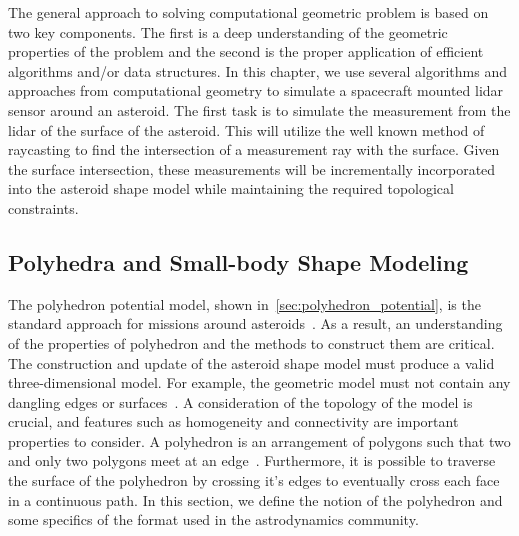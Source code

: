 The general approach to solving computational geometric problem is based on two key components.
The first is a deep understanding of the geometric properties of the problem and the second is the proper application of efficient algorithms and/or data structures.
In this chapter, we use several algorithms and approaches from computational geometry to simulate a spacecraft mounted \gls{lidar} sensor around an asteroid.
The first task is to simulate the measurement from the \gls{lidar} of the surface of the asteroid.
This will utilize the well known method of \gls{raycasting} to find the intersection of a measurement ray with the surface.
Given the surface intersection, these measurements will be incrementally incorporated into the asteroid shape model while maintaining the required topological constraints.

\subsection{Polyhedra and Small-body Shape Modeling}\label{sec:shape_model}

The polyhedron potential model, shown in~\cref{sec:polyhedron_potential}, is the standard approach for missions around asteroids~\cite{werner1994,werner1996}.
As a result, an understanding of the properties of polyhedron and the methods to construct them are critical.
The construction and update of the asteroid shape model must produce a valid three-dimensional model.
For example, the geometric model must not contain any dangling edges or surfaces~\cite{mortenson1997}.
A consideration of the topology of the model is crucial, and features such as homogeneity and connectivity are important properties to consider.
A polyhedron is an arrangement of \glspl{polygon} such that two and only two polygons meet at an edge~\cite{mortenson1997}.
Furthermore, it is possible to traverse the surface of the polyhedron by crossing it's edges to eventually cross each face in a continuous path.
In this section, we define the notion of the polyhedron and some specifics of the format used in the astrodynamics community.

